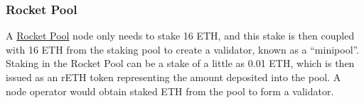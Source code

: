 \documentclass{article}
\begin{document}
%
% 
%
%


\subsubsection*{Rocket Pool}
A \href{https://rocketpool.net/}{Rocket Pool} node only needs to stake 16 ETH,
and this stake is then coupled with 16 ETH from the staking pool to create a
validator, known as a ``minipool''.  Staking in the Rocket Pool can be a stake
of a little as 0.01 ETH, which is then issued as an rETH token representing the
amount deposited into the pool. A node operator would obtain staked ETH from
the pool to form a validator.
\end{document}
